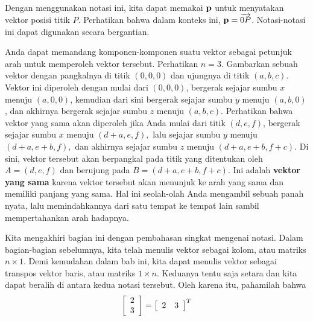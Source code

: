 Dengan menggunakan notasi ini, kita dapat memakai $\mathbf{p}$ untuk menyatakan vektor posisi titik $P$. Perhatikan bahwa dalam konteks ini, $\mathbf{p} = \overrightarrow{0P}$. Notasi-notasi ini dapat digunakan secara bergantian.

Anda dapat memandang komponen-komponen suatu vektor sebagai petunjuk arah untuk
memperoleh vektor tersebut. Perhatikan $n=3$. Gambarkan sebuah vektor dengan pangkalnya di
titik $\left( 0,0,0\right) $ dan ujungnya di titik $\left(
a,b,c\right) $. Vektor ini diperoleh dengan mulai dari $\left(
0,0,0\right) $, bergerak sejajar sumbu $x$ menuju $\left(
a,0,0\right) $, kemudian dari sini bergerak sejajar sumbu $y$ menuju
$\left( a,b,0\right) $, dan akhirnya bergerak sejajar sumbu $z$ menuju $\left(
a,b,c\right). $ Perhatikan bahwa vektor yang sama akan diperoleh jika Anda mulai
dari titik $ \left( d,e,f \right)$, bergerak sejajar sumbu $x$
menuju $\left( d+a,e,f\right) ,$ lalu sejajar sumbu $y$ menuju $\left(
d+a,e+b,f\right) ,$ dan akhirnya sejajar sumbu $z$ menuju $\left(
d+a,e+b,f+c\right)$. Di sini, vektor tersebut akan berpangkal pada
titik yang ditentukan oleh $A= \left( d,e,f\right) $ dan berujung pada
$B=\left( d+a,e+b,f+c\right) .$ Ini adalah \textbf{vektor yang sama} karena
vektor tersebut akan menunjuk ke arah yang sama dan memiliki panjang yang sama. Hal ini seolah-olah
Anda mengambil sebuah panah nyata, 
lalu memindahkannya dari satu tempat ke tempat lain sambil mempertahankan arah
hadapnya.

Kita mengakhiri bagian ini dengan pembahasan singkat mengenai notasi. Dalam bagian-bagian sebelumnya, kita telah menulis vektor sebagai kolom, atau matriks $n \times 1$. Demi kemudahan dalam bab ini, kita dapat menulis vektor sebagai transpos vektor baris, atau matriks $1 \times n$. Keduanya tentu saja setara dan kita dapat beralih di antara kedua notasi tersebut. Oleh karena itu, pahamilah bahwa
\[
\left[
\begin{array}{r}
2 \\
3
\end{array}
\right]  = \left[
\begin{array}{rr}
2 & 3
\end{array}
\right]^T
\]

